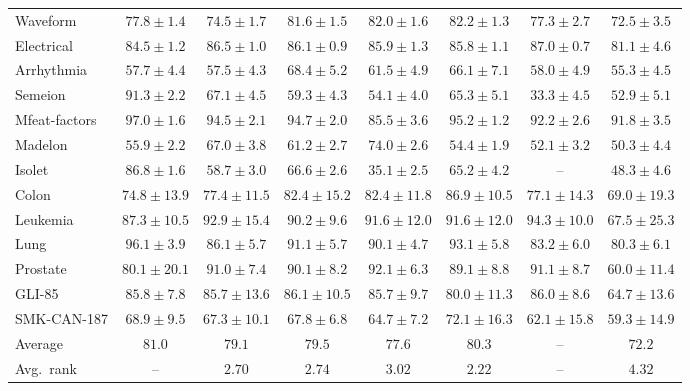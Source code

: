 \begin{minipage}{\linewidth}
{\begin{tabular}{@{}l*{7}{c}@{}}
Waveform & $77.8 \pm 1.4$ & $74.5 \pm 1.7$ & $81.6 \pm 1.5$ & $82.0 \pm 1.6$ & $\mathbf{82.2} \pm 1.3$ & $77.3 \pm 2.7$ & $72.5 \pm 3.5$ \\
Electrical & $84.5 \pm 1.2$ & $86.5 \pm 1.0$ & $86.1 \pm 0.9$ & $85.9 \pm 1.3$ & $85.8 \pm 1.1$ & $\mathbf{87.0} \pm 0.7$ & $81.1 \pm 4.6$ \\
\midrule
Arrhythmia & $57.7 \pm 4.4$ & $57.5 \pm 4.3$ & $\mathbf{68.4} \pm 5.2$ & $61.5 \pm 4.9$ & $66.1 \pm 7.1$ & $58.0 \pm 4.9$ & $55.3 \pm 4.5$ \\
Semeion & $91.3 \pm 2.2$ & $\mathbf{67.1} \pm 4.5$ & $59.3 \pm 4.3$ & $54.1 \pm 4.0$ & $65.3 \pm 5.1$ & $33.3 \pm 4.5$ & $52.9 \pm 5.1$ \\
Mfeat-factors & $97.0 \pm 1.6$ & $94.5 \pm 2.1$ & $94.7 \pm 2.0$ & $85.5 \pm 3.6$ & $\mathbf{95.2} \pm 1.2$ & $92.2 \pm 2.6$ & $91.8 \pm 3.5$ \\
Madelon & $55.9 \pm 2.2$ & $67.0 \pm 3.8$ & $61.2 \pm 2.7$ & $\mathbf{74.0} \pm 2.6$ & $54.4 \pm 1.9$ & $52.1 \pm 3.2$ & $50.3 \pm 4.4$ \\
Isolet & $86.8 \pm 1.6$ & $58.7 \pm 3.0$ & $\mathbf{66.6} \pm 2.6$ & $35.1 \pm 2.5$ & $65.2 \pm 4.2$ & -- & $48.3 \pm 4.6$ \\
\midrule
Colon & $74.8 \pm 13.9$ & $77.4 \pm 11.5$ & $82.4 \pm 15.2$ & $82.4 \pm 11.8$ & $\mathbf{86.9} \pm 10.5$ & $77.1 \pm 14.3$ & $69.0 \pm 19.3$ \\
Leukemia & $87.3 \pm 10.5$ & $92.9 \pm 15.4$ & $90.2 \pm 9.6$ & $91.6 \pm 12.0$ & $91.6 \pm 12.0$ & $\mathbf{94.3} \pm 10.0$ & $67.5 \pm 25.3$ \\
Lung & $96.1 \pm 3.9$ & $86.1 \pm 5.7$ & $91.1 \pm 5.7$ & $90.1 \pm 4.7$ & $\mathbf{93.1} \pm 5.8$ & $83.2 \pm 6.0$ & $80.3 \pm 6.1$ \\
Prostate & $80.1 \pm 20.1$ & $91.0 \pm 7.4$ & $90.1 \pm 8.2$ & $\mathbf{92.1} \pm 6.3$ & $89.1 \pm 8.8$ & $91.1 \pm 8.7$ & $60.0 \pm 11.4$ \\
GLI-85 & $85.8 \pm 7.8$ & $85.7 \pm 13.6$ & $\mathbf{86.1} \pm 10.5$ & $85.7 \pm 9.7$ & $80.0 \pm 11.3$ & $86.0 \pm 8.6$ & $64.7 \pm 13.6$ \\
SMK-CAN-187 & $68.9 \pm 9.5$ & $67.3 \pm 10.1$ & $67.8 \pm 6.8$ & $64.7 \pm 7.2$ & $\mathbf{72.1} \pm 16.3$ & $62.1 \pm 15.8$ & $59.3 \pm 14.9$ \\
\midrule
Average & $81.0$ & $79.1$ & $79.5$ & $77.6$ & $80.3$ & -- & $72.2$ \\
Avg.\ rank & -- & $2.70$ & $2.74$ & $3.02$ & $2.22$ & -- & $4.32$ \\
\bottomrule
\end{tabular}%
}
\end{minipage}\par
